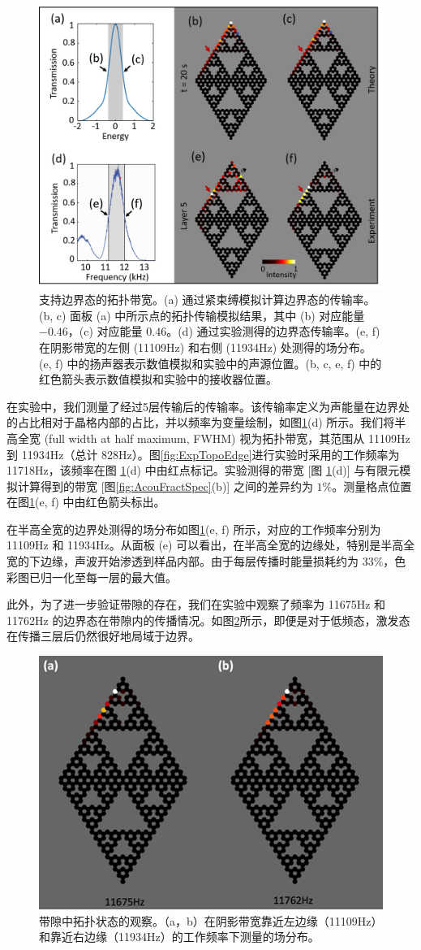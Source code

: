 \begin{figure}[htbp]
    \centering
    \includegraphics[width=0.75\linewidth]{figure/FracHaldExp/BandGap.png}
    \caption{支持边界态的拓扑带宽。(a) 通过紧束缚模拟计算边界态的传输率。(b, c) 面板 (a) 中所示点的拓扑传输模拟结果，其中 (b) 对应能量 $-0.46$，(c) 对应能量 $0.46$。(d) 通过实验测得的边界态传输率。(e, f) 在阴影带宽的左侧 (11109Hz) 和右侧 (11934Hz) 处测得的场分布。(e, f) 中的扬声器表示数值模拟和实验中的声源位置。(b, c, e, f) 中的红色箭头表示数值模拟和实验中的接收器位置。}
    \label{fig:BandGap}
\end{figure}

在实验中，我们测量了经过5层传输后的传输率。该传输率定义为声能量在边界处的占比相对于晶格内部的占比，并以频率为变量绘制，如图\ref{fig:BandGap}(d) 所示。我们将半高全宽 (full width at half maximum, FWHM) 视为拓扑带宽，其范围从 11109Hz 到 11934Hz（总计 828Hz）。图\ref{fig:ExpTopoEdge}进行实验时采用的工作频率为 11718Hz，该频率在图 \ref{fig:BandGap}(d) 中由红点标记。实验测得的带宽 [图 \ref{fig:BandGap}(d)] 与有限元模拟计算得到的带宽 [图\ref{fig:AcouFractSpec}(b)] 之间的差异约为 $1\%$。测量格点位置在图\ref{fig:BandGap}(e, f) 中由红色箭头标出。

在半高全宽的边界处测得的场分布如图\ref{fig:BandGap}(e, f) 所示，对应的工作频率分别为 11109Hz 和 11934Hz。从面板 (e) 可以看出，在半高全宽的边缘处，特别是半高全宽的下边缘，声波开始渗透到样品内部。由于每层传播时能量损耗约为 $33\%$，色彩图已归一化至每一层的最大值。

此外，为了进一步验证带隙的存在，我们在实验中观察了频率为 11675Hz 和 11762Hz 的边界态在带隙内的传播情况。如图\ref{fig:BandGap2}所示，即便是对于低频态，激发态在传播三层后仍然很好地局域于边界。
\begin{figure}[htbp]
    \centering
    \includegraphics[width=0.5\linewidth]{figure/FracHaldExp/BandGap2.png}
    \caption{带隙中拓扑状态的观察。（a，b）在阴影带宽靠近左边缘（11109Hz）和靠近右边缘（11934Hz）的工作频率下测量的场分布。}
    \label{fig:BandGap2}
\end{figure}
